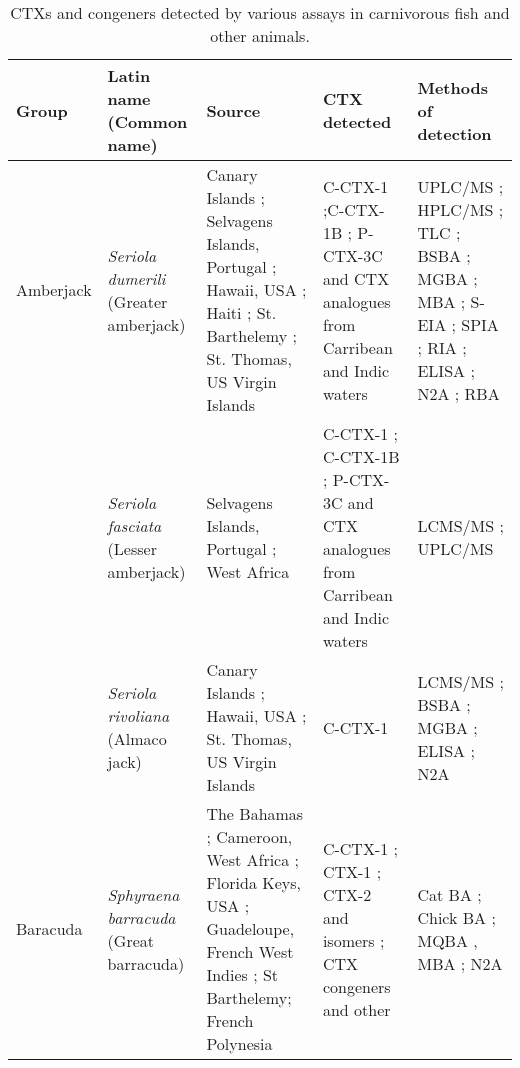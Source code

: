 \documentclass[12pt]{article}
\begin{document}
\FloatBarrier
\begin{longtable}{  | p{2cm} | p{3cm} | p{4.5cm}  | p{2cm} | p{3cm}  | }
\caption{CTXs and congeners detected by various assays in carnivorous fish and other animals.}\\
\label{tbl:CarnTable}
\textbf{Group} & \textbf{Latin name} (Common name) & \textbf{Source} & \textbf{CTX detected} & \textbf{Methods of detection} \\
\hline
Amberjack &  \emph{Seriola dumerili} (Greater amberjack) & Canary Islands \cite{caillaud2012towards}; Selvagens Islands, Portugal \cite{otero2010first}; Hawaii, USA \cite{campora2008detection,hokama1977radioimmunoassay,hokama1983rapid,hokama1985rapid}; Haiti \cite{poli1997identification}; St. Barthelemy \cite{vernoux1986heterogeneity}; St. Thomas, US Virgin Islands \cite{granade1976ciguatera} & C-CTX-1 \cite{poli1997identification};C-CTX-1B \cite{otero2010first}; P-CTX-3C and CTX analogues from Carribean and Indic waters \cite{otero2010first} & UPLC/MS \cite{otero2010first}; HPLC/MS \cite{poli1997identification}; TLC \cite{vernoux1986heterogeneity}; BSBA \cite{granade1976ciguatera}; MGBA \cite{campora2008detection,granade1976ciguatera}; MBA \cite{hokama1983rapid,hokama1985rapid,vernoux1986heterogeneity}; S-EIA \cite{hokama1985rapid}; SPIA \cite{otero2010first}; RIA \cite{campora2008detection,hokama1983rapid}; ELISA \cite{campora2008detection}; N2A \cite{caillaud2012towards,campora2008detection}; RBA \cite{} \\
  & \emph{Seriola fasciata} (Lesser amberjack) & Selvagens Islands, Portugal \cite{otero2010first}; West Africa \cite{boada2010ciguatera} & C-CTX-1 \cite{boada2010ciguatera}; C-CTX-1B \cite{otero2010first}; P-CTX-3C and CTX analogues from Carribean and Indic waters \cite{otero2010first} & LCMS/MS \cite{boada2010ciguatera}; UPLC/MS \cite{otero2010first}\\
 & \emph{Seriola rivoliana} (Almaco jack) & Canary Islands \cite{campora2010evaluating}; Hawaii, USA \cite{campora2008detection}; St. Thomas, US Virgin Islands \cite{granade1976ciguatera} & C-CTX-1 \cite{} & LCMS/MS \cite{}; BSBA \cite{granade1976ciguatera}; MGBA \cite{granade1976ciguatera}; ELISA \cite{campora2008detection,campora2010evaluating}; N2A \cite{campora2008detection,campora2010evaluating} \\
 \hline
Baracuda & \emph{Sphyraena barracuda} (Great barracuda) & The Bahamas \cite{o2012linking}; Cameroon, West Africa \cite{bienfang2008ciguatera}; Florida Keys, USA \cite{dechraoui2005use}; Guadeloupe, French West Indies \cite{pottier2003identification,pottier2001ciguatera}; St Barthelemy\cite{pottier2001ciguatera,vernoux1986heterogeneity}; French Polynesia \cite{bagnis1987use} & C-CTX-1 \cite{dechraoui2005use,pottier2003identification}; CTX-1 \cite{pottier2003identification}; CTX-2 and isomers \cite{pottier2003identification}; CTX congeners and other \cite{pottier2003identification}& Cat BA \cite{bagnis1987use}; Chick BA \cite{pottier2001ciguatera}; MQBA \cite{bagnis1987use}, MBA \cite{bagnis1987use,pottier2002characterisation,pottier2003identification}; N2A \cite{o2012linking} \\

\end{longtable}
\end{document}
